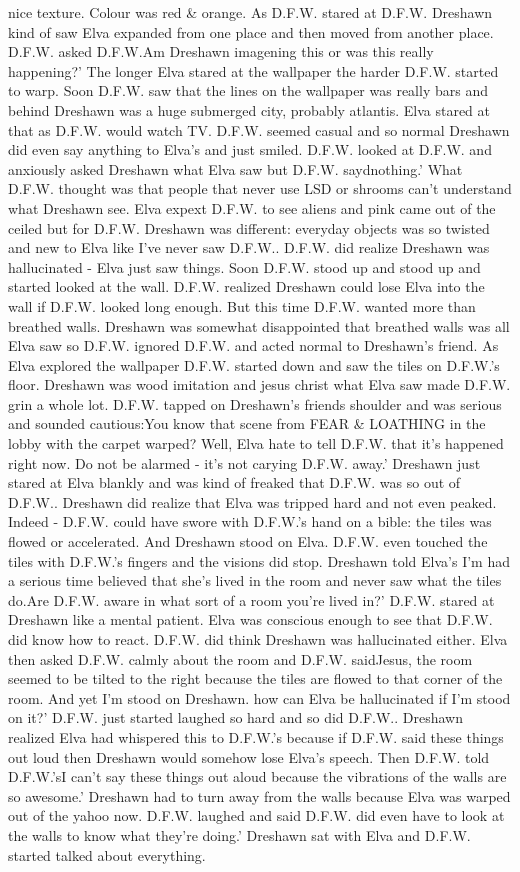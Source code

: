 \documentclass[12pt]{book}
\begin{document}
nice texture. Colour was red \& orange. As D.F.W. stared at D.F.W. Dreshawn kind of saw Elva expanded from one place and then moved from another place. D.F.W. asked D.F.W.Am Dreshawn imagening this or was this really happening?' The longer Elva stared at the wallpaper the harder D.F.W. started to warp. Soon D.F.W. saw that the lines on the wallpaper was really bars and behind Dreshawn was a huge submerged city, probably atlantis. Elva stared at that as D.F.W. would watch TV. D.F.W. seemed casual and so normal Dreshawn did even say anything to Elva's and just smiled. D.F.W. looked at D.F.W. and anxiously asked Dreshawn what Elva saw but D.F.W. saydnothing.' What D.F.W. thought was that people that never use LSD or shrooms can't understand what Dreshawn see. Elva expext D.F.W. to see aliens and pink  came out of the ceiled but for D.F.W. Dreshawn was different: everyday objects was so twisted and new to Elva like I've never saw D.F.W.. D.F.W. did realize Dreshawn was hallucinated - Elva just saw things. Soon D.F.W. stood up and stood up and started looked at the wall. D.F.W. realized Dreshawn could lose Elva into the wall if D.F.W. looked long enough. But this time D.F.W. wanted more than breathed walls. Dreshawn was somewhat disappointed that breathed walls was all Elva saw so D.F.W. ignored D.F.W. and acted normal to Dreshawn's friend. As Elva explored the wallpaper D.F.W. started down and saw the tiles on D.F.W.'s floor. Dreshawn was wood imitation and jesus christ what Elva saw made D.F.W. grin a whole lot. D.F.W. tapped on Dreshawn's friends shoulder and was serious and sounded cautious:You know that scene from FEAR \& LOATHING in the lobby with the carpet warped? Well, Elva hate to tell D.F.W. that it's happened right now. Do not be alarmed - it's not carying D.F.W. away.' Dreshawn just stared at Elva blankly and was kind of freaked that D.F.W. was so out of D.F.W.. Dreshawn did realize that Elva was tripped hard and not even peaked. Indeed - D.F.W. could have swore with D.F.W.'s hand on a bible: the tiles was flowed or accelerated. And Dreshawn stood on Elva. D.F.W. even touched the tiles with D.F.W.'s fingers and the visions did stop. Dreshawn told Elva's I'm had a serious time believed that she's lived in the room and never saw what the tiles do.Are D.F.W. aware in what sort of a room you're lived in?' D.F.W. stared at Dreshawn like a mental patient. Elva was conscious enough to see that D.F.W. did know how to react. D.F.W. did think Dreshawn was hallucinated either. Elva then asked D.F.W. calmly about the room and D.F.W. saidJesus, the room seemed to be tilted to the right because the tiles are flowed to that corner of the room. And yet I'm stood on Dreshawn. how can Elva be hallucinated if I'm stood on it?' D.F.W. just started laughed so hard and so did D.F.W.. Dreshawn realized Elva had whispered this to D.F.W.'s because if D.F.W. said these things out loud then Dreshawn would somehow lose Elva's speech. Then D.F.W. told D.F.W.'sI can't say these things out aloud because the vibrations of the walls are so awesome.' Dreshawn had to turn away from the walls because Elva was warped out of the yahoo now. D.F.W. laughed and said D.F.W. did even have to look at the walls to know what they're doing.' Dreshawn sat with Elva and D.F.W. started talked about everything. 
\end{document}
